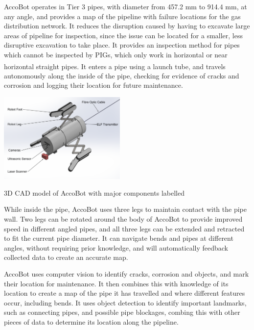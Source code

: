 \documentclass[11pt]{article}		%
\newcommand{\supercite}[1]{\textsuperscript{\cite{#1}}}		%
\begin{document}
		AccoBot operates in Tier 3 pipes, with diameter from 457.2 mm to 914.4 mm, at any angle, and provides a map of the pipeline with failure locations for the gas distribution network.
		It reduces the disruption caused by having to excavate large areas of pipeline for inspection, since the issue can be located for a smaller, less disruptive excavation to take place.
		It provides an inspection method for pipes which cannot be inspected by PIGs, which only work in horizontal or near horizontal straight pipes\supercite{mills2017advances}.
		It enters a pipe using a launch tube, and travels autonomously along the inside of the pipe, checking for evidence of cracks and corrosion and logging their location for future maintenance.
		
		\begin{floatingfigure}[r]{0.5\textwidth}
		\centering
			\includegraphics[width = 0.47\textwidth]{overviewCADLabels}
			\caption{3D CAD model of AccoBot with major components labelled}
			\label{3DSketch}
		\end{floatingfigure}
		
		While inside the pipe, AccoBot uses three legs to maintain contact with the pipe wall.
		Two legs can be rotated around the body of AccoBot to provide improved speed in different angled pipes, and all three legs can be extended and retracted to fit the current pipe diameter.
		It can navigate bends and pipes at different angles, without requiring prior knowledge, and will automatically feedback collected data to create an accurate map.
		
				
		AccoBot uses computer vision to identify cracks, corrosion and objects, and mark their location for maintenance.
		It then combines this with knowledge of its location to create a map of the pipe it has travelled and where different features occur, including bends.
		It uses object detection to identify important landmarks, such as connecting pipes, and possible pipe blockages, combing this with other pieces of data to determine its location along the pipeline.
		
\end{document}
